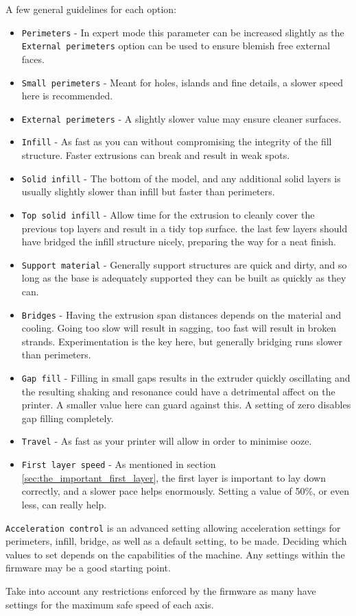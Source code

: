 A few general guidelines for each option:
\begin{itemize}
	\item \texttt{Perimeters}  - In expert mode this parameter can be increased slightly as the \texttt{External perimeters} option can be used to ensure blemish free external faces.
	\item \texttt{Small perimeters}  - Meant for holes, islands and fine details, a slower speed here is recommended.
	\item \texttt{External perimeters}  - A slightly slower value may ensure cleaner surfaces.
	\item \texttt{Infill}  - As fast as you can without compromising the integrity of the fill structure.  Faster extrusions can break and result in weak spots.
	\item \texttt{Solid infill}  - The bottom of the model, and any additional solid layers is usually slightly slower than infill but faster than perimeters.
	\item \texttt{Top solid infill}  - Allow time for the extrusion to cleanly cover the previous top layers and result in a tidy top surface.  the last few layers should have bridged the infill structure nicely, preparing the way for a neat finish. 
	\item \texttt{Support material}  - Generally support structures are quick and dirty, and so long as the base is adequately supported they can be built as quickly as they can.
	\item \texttt{Bridges}  - Having the extrusion span distances depends on the material and cooling.  Going too slow will result in sagging, too fast will result in broken strands.  Experimentation is the key here, but generally bridging runs slower than perimeters.
	\item \texttt{Gap fill}  - Filling in small gaps results in the extruder quickly oscillating and the resulting shaking and resonance could have a detrimental affect on the printer.  A smaller value here can guard against this.  A setting of zero disables gap filling completely.
	\item \texttt{Travel}  - As fast as your printer will allow in order to minimise ooze.
	\item \texttt{First layer speed}  - As mentioned in section \ref{sec:the_important_first_layer}, the first layer is important to lay down correctly, and a slower pace helps enormously.  Setting a value of 50\%, or even less, can really help.
\end{itemize}

\texttt{Acceleration control} is an advanced setting allowing acceleration settings for perimeters, infill, bridge, as well as a default setting, to be made.  Deciding which values to set depends on the capabilities of the machine.  Any settings within the firmware may be a good starting point.

Take into account any restrictions enforced by the firmware as many have settings for the maximum safe speed of each axis.

